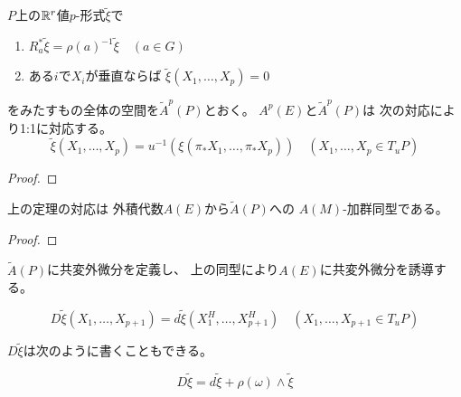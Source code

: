 \documentclass[report]{jlreq}
\begin{document}
\begin{theorem}[微分形式の対応]
    $P$上の$\mathbb{R}^r$値$p$-形式$\widetilde{\xi}$で
    \begin{enumerate}
        \item $R_a^* \widetilde{\xi} = \rho(a)^{-1} \widetilde{\xi} \quad (a \in G)$
        \item ある$i$で$X_i$が垂直ならば
            $\widetilde{\xi}(X_1, \dots, X_p) = 0$
    \end{enumerate}
    をみたすもの全体の空間を$\widetilde{A}^p(P)$とおく。
    $A^p(E)$と$\widetilde{A}^p(P)$は
    次の対応により1:1に対応する。
    \begin{equation}
        \widetilde{\xi}(X_1, \dots, X_p)
            = u^{-1} (\xi (\pi_* X_1, \dots, \pi_* X_p))
            \quad
            (X_1, \dots, X_p \in T_u P)
    \end{equation}
    \TODO{}
\end{theorem}

\begin{proof}
    \TODO{}
\end{proof}

\begin{proposition}
    上の定理の対応は
    外積代数$A(E)$から$\widetilde{A}(P)$への
    $A(M)$-加群同型である。
    \TODO{}
\end{proposition}

\begin{proof}
    \TODO{}
\end{proof}

$\widetilde{A}(P)$に共変外微分を定義し、
上の同型により$A(E)$に共変外微分を誘導する。

\begin{definition}
    \begin{equation}
        D\widetilde{\xi}(X_1, \dots, X_{p + 1})
            = d\widetilde{\xi}(X^H_1, \dots, X^H_{p + 1})
            \quad
            (X_1, \dots, X_{p + 1} \in T_u P)
    \end{equation}
    \TODO{}
\end{definition}

$D\widetilde{\xi}$は次のように書くこともできる。

\begin{proposition}
    \begin{equation}
        D\widetilde{\xi} = d\widetilde{\xi} + \rho(\omega) \wedge \widetilde{\xi}
    \end{equation}
    \TODO{}
\end{proposition}
\end{document}
